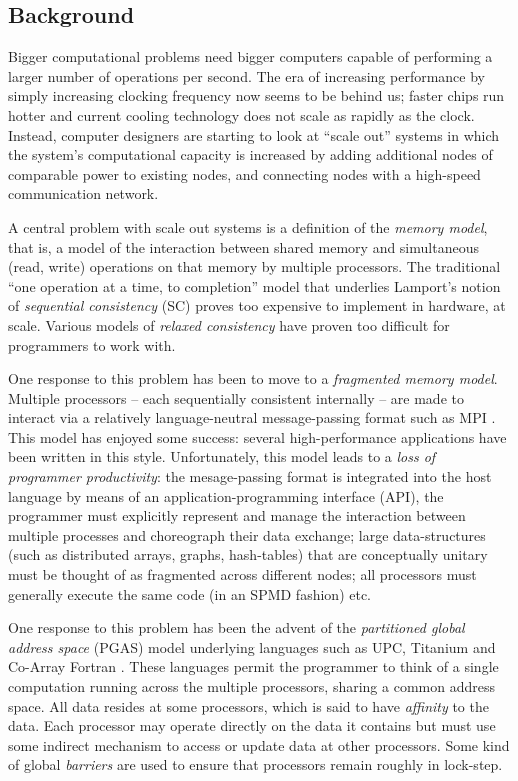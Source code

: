 
\subsection*{Background}

Bigger computational problems need bigger computers capable of
performing a larger number of operations per second. The era of
increasing performance by simply increasing clocking frequency now
seems to be behind us; faster chips run hotter and current cooling
technology does not scale as rapidly as the clock. Instead, computer
designers are starting to look at ``scale out'' systems in which the
system's computational capacity is increased by adding additional
nodes of comparable power to existing nodes, and connecting nodes with
a high-speed communication network.

A central problem with scale out systems is a definition of the {\em
memory model}, that is, a model of the interaction between shared
memory and  simultaneous (read, write) operations on that
memory by multiple processors. The traditional ``one operation at a
time, to completion'' model that underlies Lamport's notion of {\em
sequential consistency} (SC) proves too expensive to implement in
hardware, at scale. Various models of {\em relaxed consistency} have
proven too difficult for programmers to work with.  

One response to this problem has been to move to a {\em fragmented
memory model}. Multiple processors -- each sequentially consistent
internally -- are made to interact via a relatively language-neutral
message-passing format such as MPI \cite{mpi}. This model has enjoyed
some success: several high-performance applications have been written
in this style. Unfortunately, this model leads to a {\em loss of
programmer productivity}: the mesage-passing format is integrated into
the host language by means of an application-programming interface
(API), the programmer must explicitly represent and manage the
interaction between multiple processes and choreograph their data
exchange; large data-structures (such as distributed arrays, graphs,
hash-tables) that are conceptually unitary must be thought of as
fragmented across different nodes; all processors must generally
execute the same code (in an SPMD fashion) etc.

One response to this problem has been the advent of the {\em
partitioned global address space} (PGAS) model underlying languages such as
UPC, Titanium and Co-Array Fortran \cite{pgas}. These languages permit
the programmer to think of a single computation running across the
multiple processors, sharing a common address space. All data resides
at some processors, which is said to have {\em affinity} to the
data. Each processor may operate directly on the data it contains but
must use some indirect mechanism to access or update data at other
processors. Some kind of global {\em barriers} are used to ensure that
processors remain roughly in lock-step.

